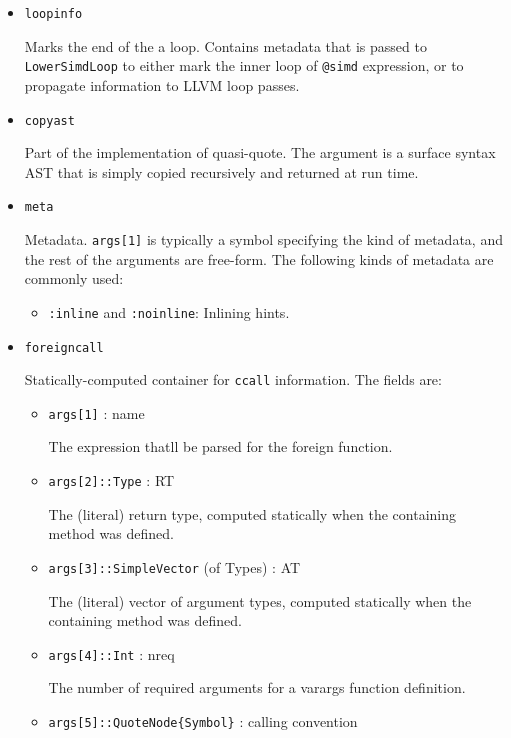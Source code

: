 \begin{itemize}
\item \texttt{loopinfo}

Marks the end of the a loop. Contains metadata that is passed to \texttt{LowerSimdLoop} to either mark the inner loop of \texttt{@simd} expression, or to propagate information to LLVM loop passes.


\item \texttt{copyast}

Part of the implementation of quasi-quote. The argument is a surface syntax AST that is simply copied recursively and returned at run time.


\item \texttt{meta}

Metadata. \texttt{args[1]} is typically a symbol specifying the kind of metadata, and the rest of the arguments are free-form. The following kinds of metadata are commonly used:

\begin{itemize}
\item \texttt{:inline} and \texttt{:noinline}: Inlining hints.

\end{itemize}

\item \texttt{foreigncall}

Statically-computed container for \texttt{ccall} information. The fields are:

\begin{itemize}
\item \texttt{args[1]} : name

The expression that{\textquotesingle}ll be parsed for the foreign function.


\item \texttt{args[2]::Type} : RT

The (literal) return type, computed statically when the containing method was defined.


\item \texttt{args[3]::SimpleVector} (of Types) : AT

The (literal) vector of argument types, computed statically when the containing method was defined.


\item \texttt{args[4]::Int} : nreq

The number of required arguments for a varargs function definition.


\item \texttt{args[5]::QuoteNode\{Symbol\}} : calling convention


\end{itemize}
\end{itemize}

